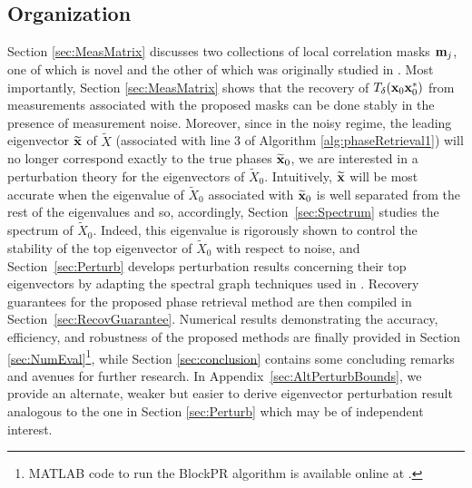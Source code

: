 
\subsection{Organization}  Section \ref{sec:MeasMatrix} discusses two collections of local correlation masks $\mathbf m_j$, one of which is novel and the other of which was originally studied in \cite{IVW2015_FastPhase}.  Most importantly, Section \ref{sec:MeasMatrix} shows that the recovery of $T_\delta(\mathbf x_0\mathbf x_0^*)$ from measurements associated with the proposed masks can be done stably in the presence of measurement noise. %
Moreover, since in the noisy regime, the leading eigenvector $\widetilde{\mathbf x}$ of $\widetilde{X}$ (associated with line 3 of Algorithm \ref{alg:phaseRetrieval1}) will no longer correspond exactly to the true phases $\widetilde{\mathbf x}_0$, we are interested in a perturbation theory for the eigenvectors of $\widetilde{X}_0$.  Intuitively, $\widetilde{\mathbf x}$ will be most accurate when the eigenvalue of $\widetilde X_0$ associated with $\widetilde{\mathbf x}_0$ is well separated from the rest of the eigenvalues and so, accordingly, Section~\ref{sec:Spectrum} studies the spectrum of $\widetilde X_0$.  Indeed, this eigenvalue is rigorously shown to control the stability of the top eigenvector of $\widetilde{X}_0$ with respect to noise, and Section~\ref{sec:Perturb} develops perturbation results concerning their top eigenvectors by adapting the spectral graph techniques used in \cite{alexeev2014phase}.  Recovery guarantees for the proposed phase retrieval method are then compiled in Section~\ref{sec:RecovGuarantee}.  Numerical results demonstrating the accuracy, efficiency, and robustness of the proposed methods are finally provided in Section \ref{sec:NumEval}\footnote{MATLAB code to run the BlockPR algorithm is available online at \cite{bitbucket_BlockPR}.}, while Section \ref{sec:conclusion} contains some concluding remarks and avenues for further research.  In Appendix~\ref{sec:AltPerturbBounds}, we provide an alternate, weaker but easier to derive eigenvector perturbation result analogous to the one in Section \ref{sec:Perturb} which may be of independent interest.


